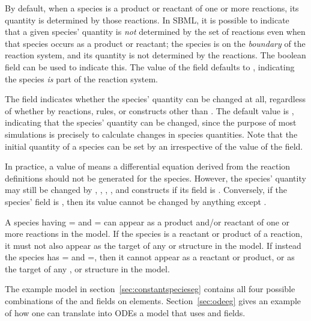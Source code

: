 By default, when a species is a product or reactant of one or more
reactions, its quantity is determined by those reactions.  In
SBML, it is possible to indicate that a given species' quantity is
\emph{not} determined by the set of reactions even when that
species occurs as a product or reactant; \ie the species is on the
\emph{boundary} of the reaction system, and its quantity is not
determined by the reactions.  The boolean field
 can be used to indicate this.  The value
of the field defaults to , indicating the species
\emph{is} part of the reaction system.

The  field indicates whether the species' quantity
can be changed at all, regardless of whether by reactions, rules,
or constructs other than \InitialAssignment.  The default value is
, indicating that the species' quantity can be changed,
since the purpose of most simulations is precisely to calculate
changes in species quantities.  Note that the initial quantity of
a species can be set by an \InitialAssignment irrespective of the
value of the  field.

In practice, a  value of  means
a differential equation derived from the reaction definitions
should not be generated for the species.  However, the species'
quantity may still be changed by \AssignmentRule, \RateRule,
\AlgebraicRule, \Event, and \InitialAssignment constructs if its
 field is .  Conversely, if the
species'  field is , then its value
cannot be changed by anything except \InitialAssignment.

A species having = and
= can appear as a product and/or
reactant of one or more reactions in the model.  If the species is
a reactant or product of a reaction, it must not also appear as
the target of any \AssignmentRule or \RateRule structure in the
model.  If instead the species has
= and
=, then it cannot appear as a reactant
or product, or as the target of any \AssignmentRule, \RateRule or
\EventAssignment structure in the model.


The example model in section~\ref{sec:constantspecieseg} contains
all four possible combinations of the 
and  fields on  elements.
Section~\ref{sec:odeeg} gives an example of how one can translate
into ODEs a model that uses  and
 fields.


